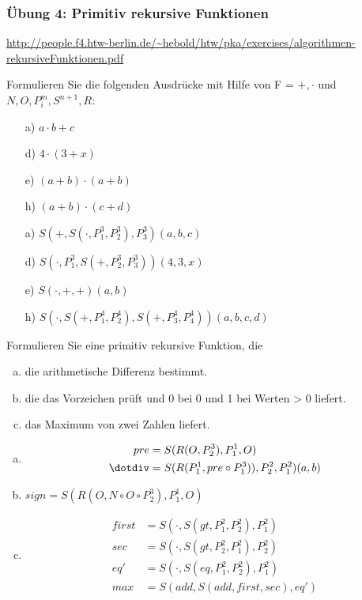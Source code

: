 \begin{card}
	\frametitle{Übung 4: Primitiv rekursive Funktionen}
	\url{http://people.f4.htw-berlin.de/~hebold/htw/pka/exercises/algorithmen-rekursiveFunktionen.pdf}
\end{card}

\begin{card}
  Formulieren Sie die folgenden Ausdrücke mit Hilfe von F = ${+, \cdot}$ und ${N, O, P^m_i, S^{n+1}, R}$:
	\begin{enumerate}[a)]
    \item[a)] $a \cdot b + c$
    \item[d)] $4 \cdot (3 + x)$
    \item[e)] $(a + b) \cdot (a + b)$
    \item[h)] $(a + b) \cdot (c + d)$
	\end{enumerate}
	\hr
	\begin{enumerate}[a)]
    \item[a)] $S(+, S(\cdot, P^3_1, P^3_2), P^3_3)(a, b, c)$
    \item[d)] $S(\cdot, P^3_1, S(+, P^3_2, P^3_3))(4, 3, x)$
    \item[e)] $S(\cdot, +, +)(a, b)$
    \item[h)] $S(\cdot, S(+, P^4_1, P^4_2), S(+, P^4_3, P^4_4))(a, b, c, d)$
	\end{enumerate}
\end{card}

\begin{card}
  Formulieren Sie eine primitiv rekursive Funktion, die
  \begin{enumerate}[a)]
    \item die arithmetische Differenz bestimmt.
    \item die das Vorzeichen prüft und 0 bei 0 und 1 bei Werten > 0 liefert.
    \item das Maximum von zwei Zahlen liefert.
	\end{enumerate}
	\hr
  \begin{enumerate}[a)]
    \item
      \begin{align*}
        pre &= S(R(O, P^3_2), P^1_1, O) \\
        \dotdiv &= S(R(P^1_1, pre \circ P^3_1)), P^2_2, P^2_1)(a, b)
      \end{align*}
    \item $sign = S(R(O, N \circ O \circ P^3_2), P^1_1, O)$
    \item
      \begin{align*}
        first &= S(\cdot, S(gt, P^2_1, P^2_2), P^2_1) \\
        sec &= S(\cdot, S(gt, P^2_2, P^2_1), P^2_2) \\
        eq' &= S(\cdot, S(eq, P^2_1, P^2_2), P^2_1) \\
        max &= S(add, S(add, first, sec), eq')
      \end{align*}
	\end{enumerate}
\end{card}


